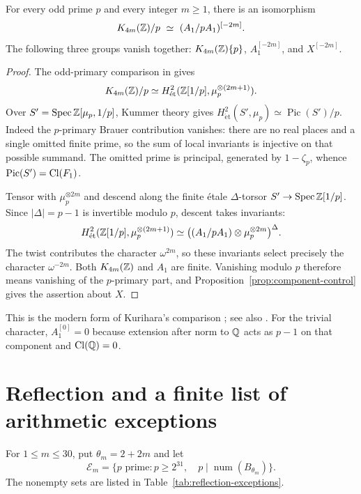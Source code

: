 \begin{proposition}\label{prop:k-component}
For every odd prime $p$ and every integer $m\geq1$, there is an
isomorphism
\[
 K_{4m}(\Z)/p\ \simeq\ (A_1/pA_1)^{[-2m]}.
\]
The following three groups vanish together:
$K_{4m}(\mathbb Z)\{p\}$, $A_1^{[-2m]}$, and $X^{[-2m]}$.
\end{proposition}
\begin{proof}
The odd-primary comparison in \cite[VI, Corollary~8.3]{Weibel}
gives
\[
 K_{4m}(\mathbb Z)/p\simeq
 H^2_{\mathrm{\acute et}}(\mathbb Z[1/p],\mu_p^{\otimes(2m+1)}).
\]
Over $S'=\operatorname{Spec}\mathbb Z[\mu_p,1/p]$, Kummer theory gives
$H^2_{\mathrm{\acute et}}(S',\mu_p)\simeq\operatorname{Pic}(S')/p$.
Indeed the $p$-primary Brauer contribution vanishes: there are no
real places and a single omitted finite prime, so the sum of local
invariants is injective on that possible summand. The omitted prime
is principal, generated by $1-\zeta_p$, whence
$\operatorname{Pic}(S')=\operatorname{Cl}(F_1)$.

Tensor with $\mu_p^{\otimes2m}$ and descend along the finite
\'etale $\Delta$-torsor $S'\to\operatorname{Spec}\mathbb Z[1/p]$.
Since $|\Delta|=p-1$ is invertible modulo $p$, descent takes invariants:
\[
 H^2_{\mathrm{\acute et}}(\mathbb Z[1/p],\mu_p^{\otimes(2m+1)})
 \simeq\bigl((A_1/pA_1)\otimes\mu_p^{\otimes2m}\bigr)^\Delta.
\]
The twist contributes the character $\omega^{2m}$, so these invariants
select precisely the character $\omega^{-2m}$. Both $K_{4m}(\mathbb Z)$
and $A_1$ are finite. Vanishing modulo $p$ therefore means vanishing
of the $p$-primary part, and Proposition~\ref{prop:component-control}
gives the assertion about $X$.
\end{proof}
This is the modern form of Kurihara's comparison
\cite[Corollary~1.5, Proposition~3.7 and Remark~3.11]{Kurihara};
see also \cite[VI, Theorem~10.9]{Weibel}. For the trivial character,
$A_1^{[0]}=0$ because extension after norm to $\mathbb Q$ acts as $p-1$
on that component and $\operatorname{Cl}(\mathbb Q)=0$.



\section{Reflection and a finite list of arithmetic exceptions}
For $1\leq m\leq30$, put $\theta_m=2+2m$ and let
\[
 \mathcal E_m=\{p\text{ prime}:p\geq2^{31},\quad
             p\mid\operatorname{num}(B_{\theta_m})\}.
\]
The nonempty sets are listed in Table~\ref{tab:reflection-exceptions}.

